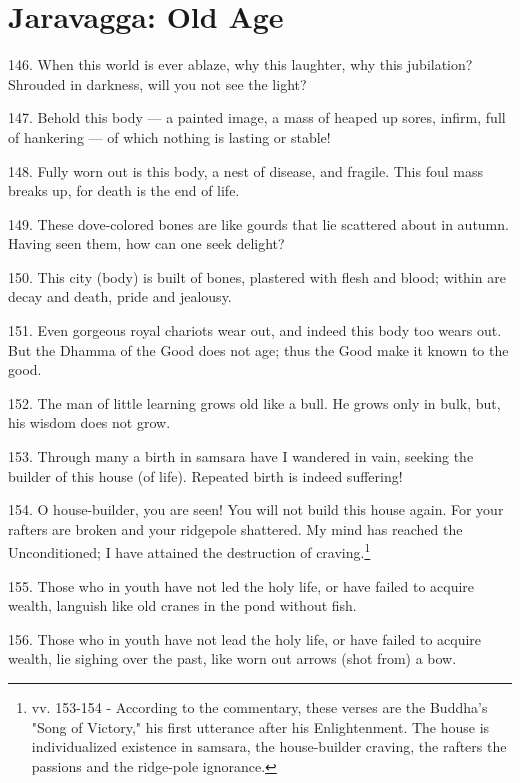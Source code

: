\newpage
\chapter{Jaravagga: Old Age}

146. When this world is ever ablaze, why this laughter, why this jubilation? Shrouded in darkness, will you not see the light?

147. Behold this body — a painted image, a mass of heaped up sores, infirm, full of hankering — of which nothing is lasting or stable!

148. Fully worn out is this body, a nest of disease, and fragile. This foul mass breaks up, for death is the end of life.

149. These dove-colored bones are like gourds that lie scattered about in autumn. Having seen them, how can one seek delight?

150. This city (body) is built of bones, plastered with flesh and blood; within are decay and death, pride and jealousy.

151. Even gorgeous royal chariots wear out, and indeed this body too wears out. But the Dhamma of the Good does not age; thus the Good make it known to the good.

152. The man of little learning grows old like a bull. He grows only in bulk, but, his wisdom does not grow.

153. Through many a birth in samsara have I wandered in vain, seeking the builder of this house (of life). Repeated birth is indeed suffering!

154. O house-builder, you are seen! You will not build this house again. For your rafters are broken and your ridgepole shattered. My mind has reached the Unconditioned; I have attained the destruction of craving.\footnote{vv. 153-154 - According to the commentary, these verses are the Buddha's "Song of Victory," his first utterance after his Enlightenment. The house is individualized existence in samsara, the house-builder craving, the rafters the passions and the ridge-pole ignorance.}

155. Those who in youth have not led the holy life, or have failed to acquire wealth, languish like old cranes in the pond without fish.

156. Those who in youth have not lead the holy life, or have failed to acquire wealth, lie sighing over the past, like worn out arrows (shot from) a bow.
